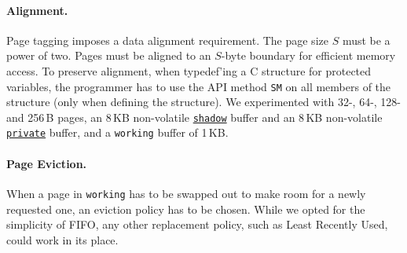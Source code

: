 \paragraph{Alignment.}
Page tagging imposes a data alignment requirement.
The page size $S$ must be a power of two. 
%
Pages must be aligned to an $S$-byte boundary for efficient memory access. 
%
To preserve alignment, when typedef'ing a C structure for protected variables, the programmer has to use the API method \texttt{SM} on all members of the structure (only when defining the structure).
%
We experimented with 32-, 64-, 128- and 256\,B pages, an 8\,KB non-volatile \texttt{\underline{shadow}} buffer and
an 8\,KB non-volatile \texttt{\underline{private}} buffer, and a \texttt{working} buffer
of 1\,KB.

\paragraph{Page Eviction.}
When a page in \texttt{working} has to be swapped out to make room for a newly requested one, an eviction policy has to be chosen.
While we opted for the simplicity of FIFO, any other replacement policy, such as Least Recently Used, could work in its place.

